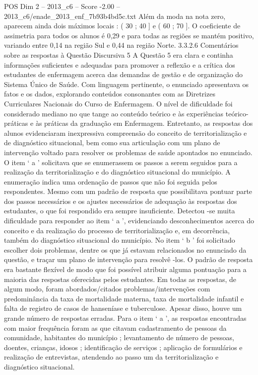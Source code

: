 \begin{textsample}{POS Dim 2 – 2013\_c6 – Score -2.00 – 2013\_c6/enade\_2013\_enf\_7b93b4bd5c.txt}
Além da moda na nota zero, aparecem ainda dois máximos locais : ( 30 ; 40 ] e ( 60 ; 70 ].
O coeficiente de assimetria para todos os alunos é 0,29 e para todas as regiões se mantém positivo, variando entre 0,14 na região Sul e 0,44 na região Norte. 3.3.2.6 Comentários sobre as respostas à Questão Discursiva 5 A Questão 5 era clara e continha informações suficientes e adequadas para promover a reflexão e a crítica dos estudantes de enfermagem acerca das demandas de gestão e de organização do Sistema Único de Saúde.
Com linguagem pertinente, o enunciado apresentava os fatos e os dados, explorando conteúdos consonantes com as Diretrizes Curriculares Nacionais do Curso de Enfermagem.
O nível de dificuldade foi considerado mediano no que tange ao conteúdo teórico e às experiências teórico-práticas e às práticas da graduação em Enfermagem.
Entretanto, as respostas dos alunos evidenciaram inexpressiva compreensão do conceito de territorialização e de diagnóstico situacional, bem como sua articulação com um plano de intervenção voltado para resolver os problemas de saúde apontados no enunciado.
O item ‘ a ’ solicitava que se enumerassem os passos a serem seguidos para a realização da territorialização e do diagnóstico situacional do município.
A enumeração indica uma ordenação de passos que não foi seguida pelos respondentes.
Mesmo com um padrão de resposta que possibilitava pontuar parte dos passos necessários e os ajustes necessários de adequação às respostas dos estudantes, o que foi respondido era sempre insuficiente.
Detectou -se muita dificuldade para responder ao item ‘ a ’, evidenciando desconhecimentos acerca do conceito e da realização do processo de territorialização e, em decorrência, também do diagnóstico situacional do município.
No item ‘ b ’ foi solicitado escolher dois problemas, dentre os que já estavam relacionados no enunciado da questão, e traçar um plano de intervenção para resolvê -los.
O padrão de resposta era bastante flexível de modo que foi possível atribuir alguma pontuação para a maioria das respostas oferecidas pelos estudantes.
Em todas as respostas, de algum modo, foram abordados/citados problemas/intervenções com predominância da taxa de mortalidade materna, taxa de mortalidade infantil e falta de registro de casos de hanseníase e tuberculose.
Apesar disso, houve um grande número de respostas erradas.
Para o item ‘ a ’, as respostas encontradas com maior frequência foram as que citavam cadastramento de pessoas da comunidade, habitantes do município ; levantamento de número de pessoas, doentes, crianças, idosos ; identificação de serviços ; aplicação de formulários e realização de entrevistas, atendendo ao passo um da territorialização e diagnóstico situacional.

\end{textsample}
